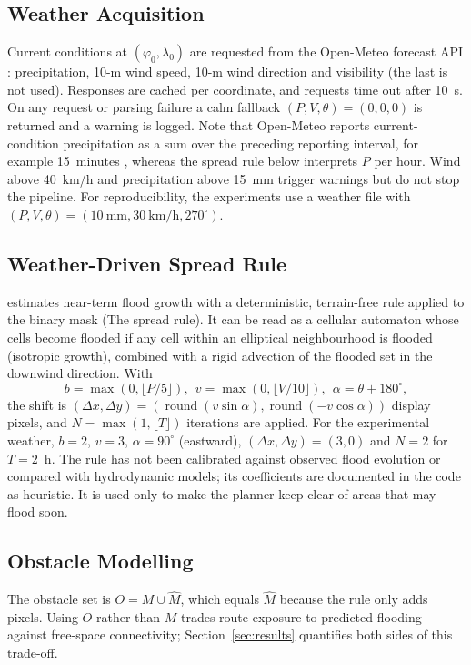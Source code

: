 \subsection{Weather Acquisition}
\label{sec:weather}
Current conditions at $(\varphi_0,\lambda_0)$ are requested from the Open-Meteo forecast API \cite{zippenfenig2024openmeteo}: precipitation, 10-m wind speed, 10-m wind direction and visibility (the last is not used). Responses are cached per coordinate, and requests time out after 10~s. On any request or parsing failure a calm fallback $(P,V,\theta)=(0,0,0)$ is returned and a warning is logged. Note that Open-Meteo reports current-condition precipitation as a sum over the preceding reporting interval, for example 15~minutes \cite{openmeteo_docs}, whereas the spread rule below interprets $P$ per hour. Wind above 40~km/h and precipitation above 15~mm trigger warnings but do not stop the pipeline. For reproducibility, the experiments use a weather file with $(P,V,\theta)=(10~\text{mm},30~\text{km/h},270^\circ)$.

\subsection{Weather-Driven Spread Rule}
\label{sec:spread}
\adapt{} estimates near-term flood growth with a deterministic, terrain-free rule applied to the binary mask (The spread rule). It can be read as a cellular automaton whose cells become flooded if any cell within an elliptical neighbourhood is flooded (isotropic growth), combined with a rigid advection of the flooded set in the downwind direction. With
\begin{equation}
b=\max(0,\lfloor P/5\rfloor),\ \ v=\max(0,\lfloor V/10\rfloor),\ \ \alpha=\theta+180^\circ,
\label{eq:spread}
\end{equation}
the shift is $(\Delta x,\Delta y)=(\operatorname{round}(v\sin\alpha),\operatorname{round}(-v\cos\alpha))$ display pixels, and $N=\max(1,\lfloor T\rfloor)$ iterations are applied. For the experimental weather, $b=2$, $v=3$, $\alpha=90^\circ$ (eastward), $(\Delta x,\Delta y)=(3,0)$ and $N=2$ for $T=2$~h. The rule has not been calibrated against observed flood evolution or compared with hydrodynamic models; its coefficients are documented in the code as heuristic. It is used only to make the planner keep clear of areas that may flood soon.



\subsection{Obstacle Modelling}
The obstacle set is $O=M\cup\hat M$, which equals $\hat M$ because the rule only adds pixels. Using $O$ rather than $M$ trades route exposure to predicted flooding against free-space connectivity; Section~\ref{sec:results} quantifies both sides of this trade-off.

